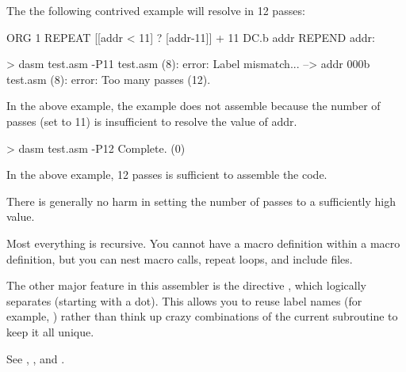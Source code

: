  The the following contrived example will resolve in 12 passes:
 
 \begin{code}
   ORG 1
   REPEAT [[addr < 11] ? [addr-11]] + 11
     DC.b addr
   REPEND
 addr:
 \end{code}
 
 \begin{outputx}
 > dasm test.asm -P11
test.asm (8): error: Label mismatch...
 --> addr 000b                  
test.asm (8): error: Too many passes (12).
\end{outputx}
  
In the above example, the example does not assemble because the number of passes (set to 11) is insufficient to resolve the value of addr.  
    
 \begin{outputx}
 > dasm test.asm -P12
 Complete. (0)
\end{outputx} 
 
 In the above example, 12 passes is sufficient to assemble the code.
 
 There is generally no harm in setting the number of passes to a sufficiently high value.
 
 
 Most everything is recursive.  You cannot have a macro definition
 within a macro definition, but you can nest macro calls, repeat loops,
 and include files.
 
 The other major feature in this assembler is the  directive , which logically separates  (starting with a dot).  This
 allows you to reuse label names (for example, ) rather than
 think up crazy combinations of the current subroutine to keep it all
 unique.
 
 See , , and .
 
 